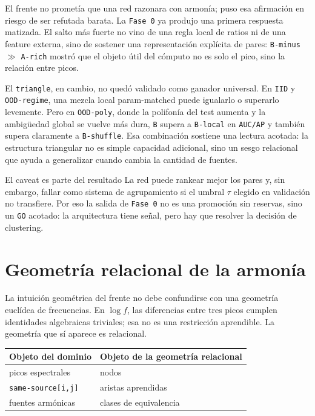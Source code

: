 \documentclass[11pt]{article}
\begin{document}
El frente no prometía que una red razonara con armonía; puso esa afirmación en riesgo de ser refutada barata. La \texttt{Fase 0} ya produjo una primera respuesta matizada. El salto más fuerte no vino de una regla local de ratios ni de una feature externa, sino de sostener una representación explícita de pares: \texttt{B-minus} $\gg$ \texttt{A-rich} mostró que el objeto útil del cómputo no es solo el pico, sino la relación entre picos.

El \texttt{triangle}, en cambio, no quedó validado como ganador universal. En \texttt{IID} y \texttt{OOD-regime}, una mezcla local param-matched puede igualarlo o superarlo levemente. Pero en \texttt{OOD-poly}, donde la polifonía del test aumenta y la ambigüedad global se vuelve más dura, \texttt{B} supera a \texttt{B-local} en \texttt{AUC/AP} y también supera claramente a \texttt{B-shuffle}. Esa combinación sostiene una lectura acotada: la estructura triangular no es simple capacidad adicional, sino un sesgo relacional que ayuda a generalizar cuando cambia la cantidad de fuentes.

\begin{keybox}{El caveat es parte del resultado}
La red puede rankear mejor los pares y, sin embargo, fallar como sistema de agrupamiento si el umbral $\tau$ elegido en validación no transfiere. Por eso la salida de \texttt{Fase 0} no es una promoción sin reservas, sino un \texttt{GO} acotado: la arquitectura tiene señal, pero hay que resolver la decisión de clustering.
\end{keybox}

\section{Geometría relacional de la armonía}

La intuición geométrica del frente no debe confundirse con una geometría euclídea de frecuencias. En $\log f$, las diferencias entre tres picos cumplen identidades algebraicas triviales; esa no es una restricción aprendible. La geometría que sí aparece es relacional.

\begin{table}[H]
\centering
\begin{tabular}{ll}
\toprule
\headrow \textbf{Objeto del dominio} & \textbf{Objeto de la geometría relacional} \\
\midrule
picos espectrales & nodos \\
\texttt{same-source[i,j]} & aristas aprendidas \\
fuentes armónicas & clases de equivalencia \\
\bottomrule
\end{tabular}
\end{table}
\end{document}
